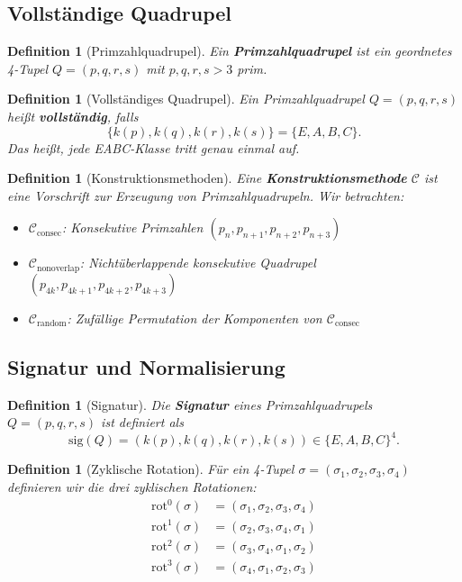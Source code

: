 \documentclass[11pt,a4paper]{article}
\newtheorem{definition}[theorem]{Definition}
\begin{document}
\subsection{Vollständige Quadrupel}

\begin{definition}[Primzahlquadrupel]
Ein \textbf{Primzahlquadrupel} ist ein geordnetes 4-Tupel $Q = (p, q, r, s)$ mit $p, q, r, s > 3$ prim.
\end{definition}

\begin{definition}[Vollständiges Quadrupel]
Ein Primzahlquadrupel $Q = (p, q, r, s)$ heißt \textbf{vollständig}, falls
\[
\{k(p), k(q), k(r), k(s)\} = \{E, A, B, C\}.
\]
Das heißt, jede EABC-Klasse tritt genau einmal auf.
\end{definition}

\begin{definition}[Konstruktionsmethoden]
Eine \textbf{Konstruktionsmethode} $\mathcal{C}$ ist eine Vorschrift zur Erzeugung von Primzahlquadrupeln. Wir betrachten:
\begin{itemize}
\item $\mathcal{C}_{\text{consec}}$: Konsekutive Primzahlen $(p_n, p_{n+1}, p_{n+2}, p_{n+3})$
\item $\mathcal{C}_{\text{nonoverlap}}$: Nichtüberlappende konsekutive Quadrupel $(p_{4k}, p_{4k+1}, p_{4k+2}, p_{4k+3})$
\item $\mathcal{C}_{\text{random}}$: Zufällige Permutation der Komponenten von $\mathcal{C}_{\text{consec}}$
\end{itemize}
\end{definition}

\subsection{Signatur und Normalisierung}

\begin{definition}[Signatur]
Die \textbf{Signatur} eines Primzahlquadrupels $Q = (p, q, r, s)$ ist definiert als
\[
\text{sig}(Q) = (k(p), k(q), k(r), k(s)) \in \{E, A, B, C\}^4.
\]
\end{definition}

\begin{definition}[Zyklische Rotation]
Für ein 4-Tupel $\sigma = (\sigma_1, \sigma_2, \sigma_3, \sigma_4)$ definieren wir die drei zyklischen Rotationen:
\[
\begin{aligned}
\text{rot}^0(\sigma) &= (\sigma_1, \sigma_2, \sigma_3, \sigma_4) \\
\text{rot}^1(\sigma) &= (\sigma_2, \sigma_3, \sigma_4, \sigma_1) \\
\text{rot}^2(\sigma) &= (\sigma_3, \sigma_4, \sigma_1, \sigma_2) \\
\text{rot}^3(\sigma) &= (\sigma_4, \sigma_1, \sigma_2, \sigma_3)
\end{aligned}
\]
\end{definition}
\end{document}

